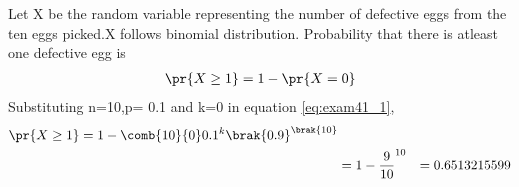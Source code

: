 Let X be the random variable representing the number of defective eggs from the ten eggs picked.X follows binomial distribution.
Probability that there is atleast one defective egg is 
\begin{align}
\pr{X \geq 1}= 1 - \pr{X=0} 
\end{align}
Substituting n=10,p= 0.1 and k=0 in equation \eqref{eq:exam41_1}, 
\begin{align}
\pr{X \geq 1}= 1 - \comb{10}{0}0.1^k\brak{0.9}^\brak{10}
\\
&=1-{\frac{9}{10}}^{10}
&=0.6513215599
\end{align}
